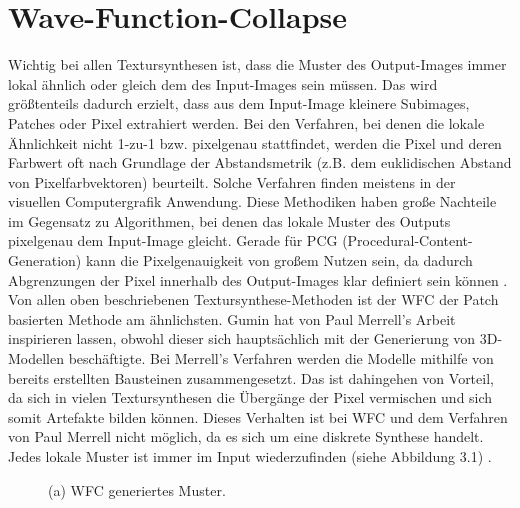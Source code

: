 \documentclass[12pt, a4paper,twoside,openany]{report} %
\begin{document}
\chapter{Wave-Function-Collapse}

Wichtig bei allen Textursynthesen ist,
dass die Muster des Output-Images immer lokal ähnlich oder gleich dem des Input-Images sein müssen.
Das wird größtenteils dadurch erzielt, dass aus dem Input-Image kleinere Subimages, Patches oder Pixel extrahiert werden.
Bei den Verfahren, bei denen die lokale Ähnlichkeit nicht 1-zu-1 bzw. pixelgenau stattfindet,
werden die Pixel und deren Farbwert oft nach Grundlage der Abstandsmetrik {(z.B. dem euklidischen Abstand von Pixelfarbvektoren)} beurteilt.
Solche Verfahren finden meistens in der visuellen Computergrafik Anwendung.
Diese Methodiken haben große Nachteile im Gegensatz zu Algorithmen, bei denen das lokale Muster des Outputs pixelgenau dem Input-Image gleicht.
Gerade für PCG {(Procedural-Content-Generation)} kann die Pixelgenauigkeit von großem Nutzen sein, da dadurch Abgrenzungen der Pixel innerhalb des Output-Images klar definiert sein können 
\cite{Karth2017WaveFunctionCollapseIC}.
Von allen oben beschriebenen Textursynthese-Methoden ist der WFC der Patch basierten Methode am ähnlichsten.
\newline
Gumin hat von Paul Merrell's Arbeit inspirieren lassen, obwohl dieser sich hauptsächlich mit der Generierung von 3D-Modellen beschäftigte.
Bei Merrell's Verfahren werden die Modelle mithilfe von bereits erstellten Bausteinen zusammengesetzt.
Das ist dahingehen von Vorteil, da sich in vielen Textursynthesen die Übergänge der Pixel vermischen und sich somit Artefakte bilden können.
Dieses Verhalten ist bei WFC und dem Verfahren von Paul Merrell nicht möglich, da es sich um eine diskrete Synthese handelt.
Jedes lokale Muster ist immer im Input wiederzufinden {(siehe Abbildung 3.1)} \cite{Karth2017WaveFunctionCollapseIC, merrell2009model, Gumin_Wave_Function_Collapse_2016}.

\begin{figure}[H]
    \centering
    \caption{(a) WFC generiertes Muster.}%
\end{figure}
\end{document}
